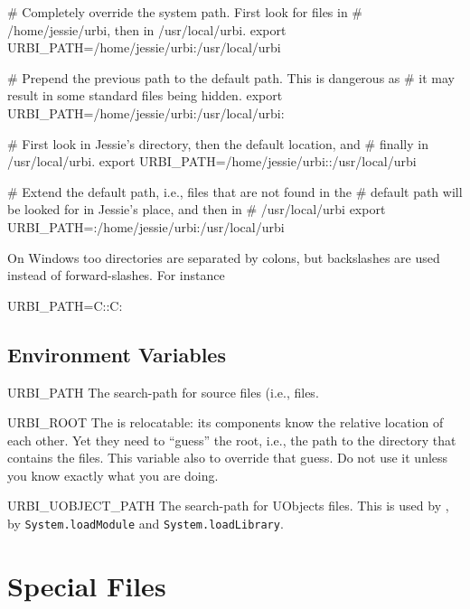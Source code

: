 \begin{shell}
# Completely override the system path.  First look for files in
# /home/jessie/urbi, then in /usr/local/urbi.
export URBI_PATH=/home/jessie/urbi:/usr/local/urbi

# Prepend the previous path to the default path.  This is dangerous as
# it may result in some standard files being hidden.
export URBI_PATH=/home/jessie/urbi:/usr/local/urbi:

# First look in Jessie's directory, then the default location, and
# finally in /usr/local/urbi.
export URBI_PATH=/home/jessie/urbi::/usr/local/urbi

# Extend the default path, i.e., files that are not found in the
# default path will be looked for in Jessie's place, and then in
# /usr/local/urbi
export URBI_PATH=:/home/jessie/urbi:/usr/local/urbi
\end{shell}

\begin{windows}
  On Windows too directories are separated by colons, but backslashes
  are used instead of forward-slashes.  For instance
\begin{shell}
URBI_PATH=C:\cygwin\home\jessie\urbi:C:\cygwin\usr\local\urbi
\end{shell}
\end{windows}

\subsection{Environment Variables}
\begin{envs}
\item[URBI\_PATH] The search-path for \us source files (i.e.,
   files.

\item[URBI\_ROOT] The \urbi is relocatable: its components know the
  relative location of each other.  Yet they need to ``guess'' the
  \urbi root, i.e., the path to the directory that contains the files.
  This variable also to override that guess.  Do not use it unless you
  know exactly what you are doing.

\item[URBI\_UOBJECT\_PATH] The search-path for UObjects files.
  This is used by , by
  \lstinline|System.loadModule| and \lstinline|System.loadLibrary|.
\end{envs}

\section{Special Files}
\label{sec:tools:files}

